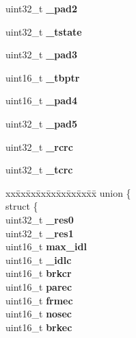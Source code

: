 \begin{DoxyCompactItemize}
uint32\+\_\+t {\bfseries \+\_\+pad2}
\item 
\mbox{\label{structm8xxSCCparms___a06fbdb0a74fd30cc53b5d874dcf6b163}} 
uint32\+\_\+t {\bfseries \+\_\+tstate}
\item 
\mbox{\label{structm8xxSCCparms___a1ea6b176b304203b755a4b631210e37c}} 
uint32\+\_\+t {\bfseries \+\_\+pad3}
\item 
\mbox{\label{structm8xxSCCparms___a60575ce51dc5c7fd489564634d9b6430}} 
uint16\+\_\+t {\bfseries \+\_\+tbptr}
\item 
\mbox{\label{structm8xxSCCparms___ad57e62dd226244e0605cf7922161c847}} 
uint16\+\_\+t {\bfseries \+\_\+pad4}
\item 
\mbox{\label{structm8xxSCCparms___a1e549ec067f644f4d6296825debef67a}} 
uint32\+\_\+t {\bfseries \+\_\+pad5}
\item 
\mbox{\label{structm8xxSCCparms___a9a6089d5ac6c8897a1ab7b5c398517b3}} 
uint32\+\_\+t {\bfseries \+\_\+rcrc}
\item 
\mbox{\label{structm8xxSCCparms___a492a024e143f3ea7310b920e4b83f164}} 
uint32\+\_\+t {\bfseries \+\_\+tcrc}
\item 
\mbox{\label{structm8xxSCCparms___a4200603271779f35338e96dca0f914cf}} 
\begin{tabbing}
xx\=xx\=xx\=xx\=xx\=xx\=xx\=xx\=xx\=\kill
union \{\\
\>struct \{\\
\>\>uint32\_t {\bfseries \_res0}\\
\>\>uint32\_t {\bfseries \_res1}\\
\>\>uint16\_t {\bfseries max\_idl}\\
\>\>uint16\_t {\bfseries \_idlc}\\
\>\>uint16\_t {\bfseries brkcr}\\
\>\>uint16\_t {\bfseries parec}\\
\>\>uint16\_t {\bfseries frmec}\\
\>\>uint16\_t {\bfseries nosec}\\
\>\>uint16\_t {\bfseries brkec}\\

\end{tabbing}
\end{DoxyCompactItemize}

